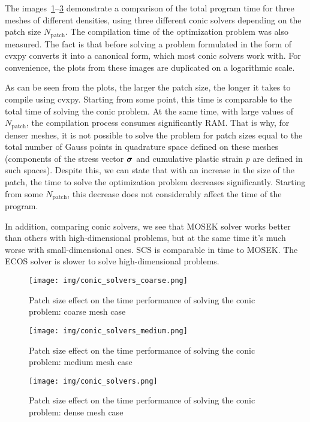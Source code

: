 \documentclass[12pt]{article}
\newcommand{\todolink}{\todo[fancyline, size=\scriptsize]{TOCITE}}
\begin{document}
The images~\ref{fig:conic_solvers_coarse}--\ref{fig:conic_solvers_dense} demonstrate a comparison of the total program time for three meshes of different densities, using three different conic solvers depending on the patch size $N_\text{patch}$. The compilation time of the optimization problem was also measured. The fact is that before solving a problem formulated in the form of \todolink cvxpy converts it into a canonical form, which most conic solvers work with. For convenience, the plots from these images are duplicated on a logarithmic scale.

As can be seen from the plots, the larger the patch size, the longer it takes to compile using cvxpy. Starting from some point, this time is comparable to the total time of solving the conic problem. At the same time, with large values of $N_\text{patch}$, the compilation process consumes significantly RAM. That is why, for denser meshes, it is not possible to solve the problem for patch sizes equal to the total number of Gauss points in quadrature space defined on these meshes (components of the stress vector $\mbox{\boldmath$\sigma$}$ and cumulative plastic strain $p$ are defined in such spaces). Despite this, we can state that with an increase in the size of the patch, the time to solve the optimization problem decreases significantly. Starting from some $N_\text{patch}$, this decrease does not considerably affect the time of the program.

In addition, comparing conic solvers, we see that MOSEK solver works better than others with high-dimensional problems, but at the same time it's much worse with small-dimensional ones. SCS is comparable in time to MOSEK. The ECOS solver is slower to solve high-dimensional problems.

\begin{figure}[H]
    \center
    \texttt{[image: img/conic\_solvers\_coarse.png]}
    \caption{Patch size effect on the time performance of solving the conic problem: coarse mesh case}
    \label{fig:conic_solvers_coarse}
\end{figure}

\begin{figure}[H]
    \center
    \texttt{[image: img/conic\_solvers\_medium.png]}
    \caption{Patch size effect on the time performance of solving the conic problem: medium mesh case}
    \label{fig:conic_solvers_medium}
\end{figure}

\begin{figure}[H]
    \center
    \texttt{[image: img/conic\_solvers.png]}
    \caption{Patch size effect on the time performance of solving the conic problem: dense mesh case}
    \label{fig:conic_solvers_dense}
\end{figure}
\end{document}
